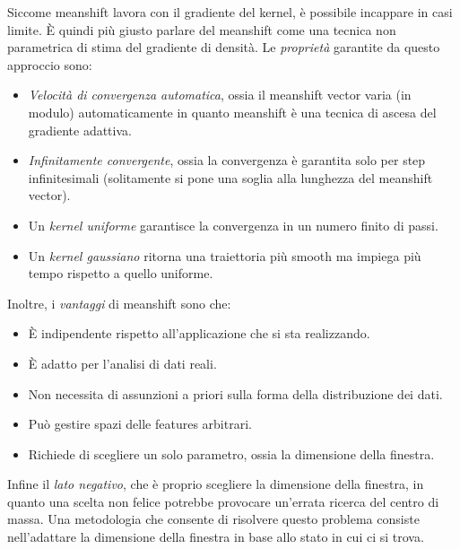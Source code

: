 \documentclass[a4paper,oneside,titlepage]{book}
\begin{document}
\newpage
\noindent
Siccome meanshift lavora con il gradiente del kernel, è possibile incappare in casi limite. \`{E} quindi più giusto parlare del meanshift come una tecnica non parametrica di stima del gradiente di densità. Le \textit{proprietà} garantite da questo approccio sono:
\begin{itemize}
    \item \textit{Velocità di convergenza automatica}, ossia il meanshift vector varia (in modulo) automaticamente in quanto meanshift è una tecnica di ascesa del gradiente adattiva.
    \item \textit{Infinitamente convergente}, ossia la convergenza è garantita solo per step infinitesimali (solitamente si pone una soglia alla lunghezza del meanshift vector).
    \item Un \textit{kernel uniforme} garantisce la convergenza in un numero finito di passi.
    \item Un \textit{kernel gaussiano} ritorna una traiettoria più smooth ma impiega più tempo rispetto a quello uniforme.
\end{itemize}
Inoltre, i \textit{vantaggi} di meanshift sono che:
\begin{itemize}
    \item \`{E} indipendente rispetto all'applicazione che si sta realizzando.
    \item \`{E} adatto per l'analisi di dati reali.
    \item Non necessita di assunzioni a priori sulla forma della distribuzione dei dati.
    \item Può gestire spazi delle features arbitrari.
    \item Richiede di scegliere un solo parametro, ossia la dimensione della finestra.
\end{itemize}
Infine il \textit{lato negativo}, che è proprio scegliere la dimensione della finestra, in quanto una scelta non felice potrebbe provocare un'errata ricerca del centro di massa. Una metodologia che consente di risolvere questo problema consiste nell'adattare la dimensione della finestra in base allo stato in cui ci si trova.
\end{document}
